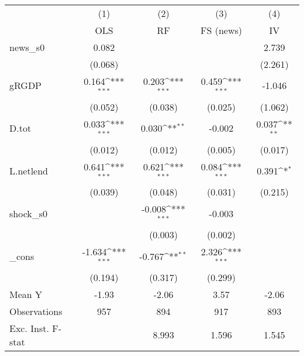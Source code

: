 {
\def\sym#1{\ifmmode^{#1}\else\(^{#1}\)\fi}
\begin{tabular}{l*{4}{c}}
\toprule
            &\multicolumn{1}{c}{(1)}&\multicolumn{1}{c}{(2)}&\multicolumn{1}{c}{(3)}&\multicolumn{1}{c}{(4)}\\
            &\multicolumn{1}{c}{OLS}&\multicolumn{1}{c}{RF}&\multicolumn{1}{c}{FS (news)}&\multicolumn{1}{c}{IV}\\
\midrule
news\_s0     &       0.082         &                     &                     &       2.739         \\
            &     (0.068)         &                     &                     &     (2.261)         \\
\addlinespace
gRGDP       &       0.164\sym{***}&       0.203\sym{***}&       0.459\sym{***}&      -1.046         \\
            &     (0.052)         &     (0.038)         &     (0.025)         &     (1.062)         \\
\addlinespace
D.tot       &       0.033\sym{***}&       0.030\sym{**} &      -0.002         &       0.037\sym{**} \\
            &     (0.012)         &     (0.012)         &     (0.005)         &     (0.017)         \\
\addlinespace
L.netlend   &       0.641\sym{***}&       0.621\sym{***}&       0.084\sym{***}&       0.391\sym{*}  \\
            &     (0.039)         &     (0.048)         &     (0.031)         &     (0.215)         \\
\addlinespace
shock\_s0    &                     &      -0.008\sym{***}&      -0.003         &                     \\
            &                     &     (0.003)         &     (0.002)         &                     \\
\addlinespace
\_cons      &      -1.634\sym{***}&      -0.767\sym{**} &       2.326\sym{***}&                     \\
            &     (0.194)         &     (0.317)         &     (0.299)         &                     \\
\midrule
Mean Y      &       -1.93         &       -2.06         &        3.57         &       -2.06         \\
Observations&         957         &         894         &         917         &         893         \\
Exc. Inst. F-stat&                     &       8.993         &       1.596         &       1.545         \\
\bottomrule
\end{tabular}
}
